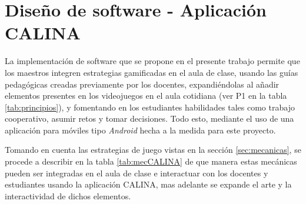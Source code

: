 %



\section{Diseño de software - Aplicación CALINA}

La implementación de software que se propone en el presente trabajo permite que los maestros integren 
estrategias gamificadas en el aula de clase, usando las guías pedagógicas creadas previamente por los 
docentes, expandiéndolas al añadir elementos presentes en los videojuegos en el aula cotidiana (ver P1 en la 
tabla \ref{tab:principios}), y fomentando en los estudiantes habilidades tales como trabajo cooperativo, 
asumir retos y tomar decisiones. Todo esto, mediante el uso de una aplicación para móviles tipo 
\textit{Android} hecha a la medida para este proyecto.

Tomando en cuenta las estrategias de juego vistas en la sección \ref{sec:mecanicas}, se procede a describir en 
la tabla \ref{tab:mecCALINA} de que manera estas mecánicas pueden ser integradas en el aula de clase e 
interactuar con los docentes y estudiantes usando la aplicación CALINA, mas adelante se expande el arte y la 
interactividad de dichos elementos.

